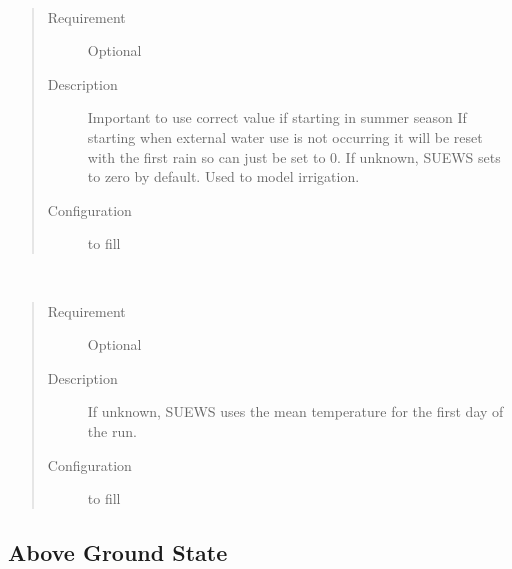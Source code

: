 \documentclass[letterpaper,10pt,english]{sphinxmanual}
\begin{document}
\begin{fulllineitems}
\label{\detokenize{input_files/Initial_Conditions/Recent_meteorology:cmdoption-arg-dayssincerain}}~\begin{quote}\begin{description}
\item[{Requirement}] \leavevmode
Optional

\item[{Description}] \leavevmode
Important to use correct value if starting in summer season If starting when external water use is not occurring it will be reset with the first rain so can just be set to 0. If unknown, SUEWS sets to zero by default. Used to model irrigation.

\item[{Configuration}] \leavevmode
to fill

\end{description}\end{quote}

\end{fulllineitems}


\begin{fulllineitems}
\label{\detokenize{input_files/Initial_Conditions/Recent_meteorology:cmdoption-arg-temp-c0}}~\begin{quote}\begin{description}
\item[{Requirement}] \leavevmode
Optional

\item[{Description}] \leavevmode
If unknown, SUEWS uses the mean temperature for the first day of the run.

\item[{Configuration}] \leavevmode
to fill

\end{description}\end{quote}

\end{fulllineitems}



\subsection{Above Ground State}
\label{\detokenize{input_files/Initial_Conditions/Above_Ground_State:above-ground-state}}\label{\detokenize{input_files/Initial_Conditions/Above_Ground_State::doc}}\label{\detokenize{input_files/Initial_Conditions/Above_Ground_State:id1}}
\end{document}
